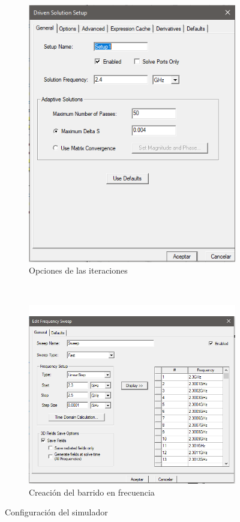 \begin{figure}[p]
\begin{subfigure}[b]{0.48\textwidth}
         \includegraphics[width=\textwidth]{archivos/desarrollo/9b}
         \caption{Opciones de las iteraciones}
         \label{fig:configb}
     \end{subfigure}
     \hfill
     \\
     \begin{subfigure}[b]{0.48\textwidth}
         \centering
         \includegraphics[width=\textwidth]{archivos/desarrollo/9c}
         \caption{Creación del barrido en frecuencia}
         \label{fig:configc}
     \end{subfigure}
     \hfill
        \caption{Configuración del simulador}
        \label{fig:config}
\end{figure}

